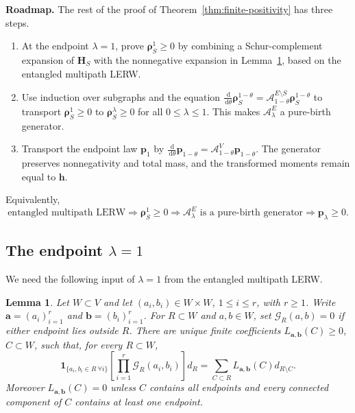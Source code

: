 \documentclass[11pt]{article}
\numberwithin{equation}{section}
\newcommand{\1}{\mathbf{1}}
\newtheorem{lemma}[theorem]{Lemma}
\newcommand{\one}{\mathbf 1}
\newcommand{\dd}{\,\mathrm d}
\newcommand{\Ac}{\mathcal A}
\newcommand{\Gc}{\mathcal G}
\newcommand{\bp}{\mathbf p}
\newcommand{\bh}{\mathbf h}
\newcommand{\bH}{\mathbf H}
\newcommand{\brho}{\boldsymbol{\rho}}
\begin{document}
\medskip
\noindent
\textbf{Roadmap.}
The rest of the proof of Theorem~\ref{thm:finite-positivity} has three steps.
\begin{enumerate}[label=\textup{(\arabic*)},leftmargin=2.2em]
\item At the endpoint $\lambda=1$, prove \(\brho_S^1\ge0\) by combining a
Schur-complement expansion of \(\bH_S\) with the nonnegative expansion in Lemma~\ref{lem:multipath-positive}, based on the entangled multipath LERW.

\item Use induction over subgraphs and the equation
\(\frac{\dd}{\dd\theta}\brho_S^{1-\theta}
=\Ac_{1-\theta}^{E\setminus S}\brho_S^{1-\theta}\) to transport
\(\brho_S^1\ge0\) to $\brho_S^\lambda\ge0$ for all \(0\le\lambda\le1\).  This makes
\(\Ac_\lambda^E\) a pure-birth generator.

\item Transport the endpoint law \(\bp_1\) by
\(\frac{\dd}{\dd\theta}\bp_{1-\theta}=\Ac_{1-\theta}^V\bp_{1-\theta}\).  The
generator preserves nonnegativity and total mass, and the transformed
moments remain equal to \(\bh\).
\end{enumerate}
Equivalently,
\[
        \text{entangled multipath LERW}
        \Longrightarrow \brho_S^1\ge0
        \Longrightarrow \Ac_\lambda^E\text{ is a pure-birth generator}
        \Longrightarrow \bp_\lambda\ge0 .
\]


\subsection{The endpoint \texorpdfstring{\(\lambda=1\)}{lambda=1}}
\label{subsec:endpoint-deconvolution}

We need the following input of $\lambda=1$ from the entangled multipath LERW.

\begin{lemma}\label{lem:multipath-positive}
Let \(W\subset V\) and let \((a_i,b_i)\in W\times W\), \(1\le i\le r\),
with \(r\ge1\).  Write \(\mathbf a=(a_i)_{i=1}^r\) and
\(\mathbf b=(b_i)_{i=1}^r\).  For \(R\subset W\) and \(a,b\in W\), set \(\Gc_R(a,b)=0\) if either endpoint lies outside \(R\). There are unique finite coefficients
\(L_{\mathbf a,\mathbf b}(C)\ge0\), \(C\subset W\), such that, for every
\(R\subset W\),
\begin{equation}\label{eq:multipath-positive}
        \one_{\{a_i,b_i\in R\ \forall i\}}
        \left[\prod_{i=1}^r\Gc_R(a_i,b_i)\right]d_R
        =\sum_{C\subset R}L_{\mathbf a,\mathbf b}(C)d_{R\setminus C} .
\end{equation}
Moreover \(L_{\mathbf a,\mathbf b}(C)=0\) unless \(C\) contains all endpoints
and every connected component of \(C\) contains at least one endpoint.
\end{lemma}
\end{document}
